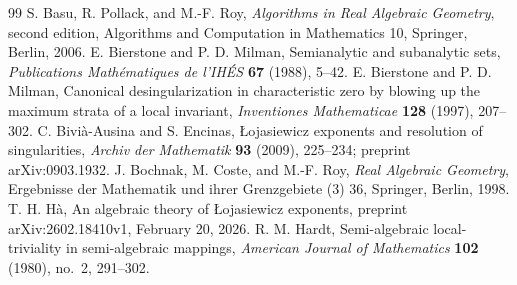 \begin{thebibliography}{99}
 S. Basu, R. Pollack, and M.-F. Roy,
\emph{Algorithms in Real Algebraic Geometry}, second edition,
Algorithms and Computation in Mathematics 10, Springer, Berlin, 2006.
 E. Bierstone and P. D. Milman,
Semianalytic and subanalytic sets,
\emph{Publications Math\'ematiques de l'IH\'ES} \textbf{67} (1988), 5--42.
 E. Bierstone and P. D. Milman,
Canonical desingularization in characteristic zero by blowing up the
maximum strata of a local invariant,
\emph{Inventiones Mathematicae} \textbf{128} (1997), 207--302.
 C. Bivi\`a-Ausina and S. Encinas,
\L{}ojasiewicz exponents and resolution of singularities,
\emph{Archiv der Mathematik} \textbf{93} (2009), 225--234;
preprint arXiv:0903.1932.
 J. Bochnak, M. Coste, and M.-F. Roy,
\emph{Real Algebraic Geometry}, Ergebnisse der Mathematik und ihrer
Grenzgebiete (3) 36, Springer, Berlin, 1998.
 T. H. H\`a,
An algebraic theory of \L{}ojasiewicz exponents,
preprint arXiv:2602.18410v1, February 20, 2026.
 R. M. Hardt,
Semi-algebraic local-triviality in semi-algebraic mappings,
\emph{American Journal of Mathematics} \textbf{102} (1980), no.~2, 291--302.
\end{thebibliography}
